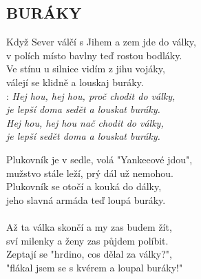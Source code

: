 \begin{flushleft}
	\section*{\Huge BURÁKY}
\end{flushleft}

Když Sever válčí s Jihem a zem jde do války,\\
v polích místo bavlny teď rostou bodláky.\\
Ve stínu u silnice vidím z jihu vojáky,\\
válejí se klidně a louskaj buráky.\\

\textregistered: \emph{
Hej hou, hej hou, proč chodit do války,\\
je lepší doma sedět a louskat buráky.\\
Hej hou, hej hou nač chodit do války,\\
je lepší sedět doma a louskat buráky.\\
}

Plukovník je v sedle, volá "Yankeeové jdou",\\
mužstvo stále leží, prý dál už nemohou.\\
Plukovník se otočí a kouká do dálky,\\
jeho slavná armáda teď loupá buráky.\\
\textregistered\\

Až ta válka skončí a my zas budem žít,\\
sví milenky a ženy zas půjdem políbit.\\
Zeptají se "hrdino, cos dělal za války?",\\
"flákal jsem se s kvérem a loupal buráky!"\\
\textregistered \textregistered
\newpage

